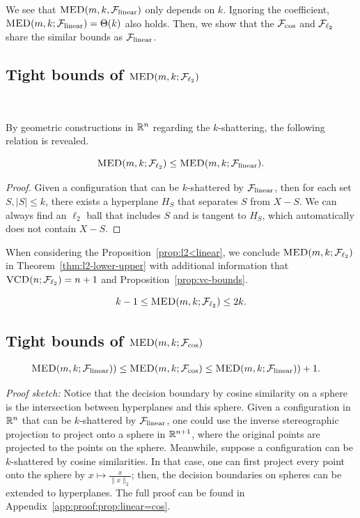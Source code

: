 We see that $\textsc{MED}(m, k, \mathcal{F}_{\rm linear})$ only depends on $k$. Ignoring the coefficient, $\textsc{MED}(m, k; \mathcal{F}_{\rm linear}) = \Theta(k)$ also holds. Then, we show that the $\mathcal{F}_{\cos}$ and $\mathcal{F}_{\ell_{2}}$ share the similar bounds as $\mathcal{F}_{\rm linear}$.

\subsection{Tight bounds of $\textsc{MED}(m, k;\mathcal{F}_{\ell_{2}})$}~\label{sec:generalize_linear}

By geometric constructions in $\mathbb{R}^n$ regarding the $k$-shattering, the following relation is revealed.

\begin{proposition}\label{prop:l2<linear}

$$\textsc{MED}(m, k; \mathcal{F}_{\ell_{2}}) \leq \textsc{MED}(m, k; \mathcal{F}_{\rm linear}). $$

\end{proposition}
\begin{proof}
Given a configuration that can be $k$-shattered by $\mathcal{F}_{\rm linear}$, then for each set $S, |S| \leq k$, there exists a hyperplane $H_S$ that separates $S$ from $X-S$. We can always find an $\ell_2$ ball that includes $S$ and is tangent to $H_S$, which automatically does not contain $X-S$.
\end{proof}
When considering the Proposition~\ref{prop:l2<linear}, we conclude $\textsc{MED}(m, k;\mathcal{F}_{\ell_{2}})$ in Theorem~\ref{thm:l2-lower-upper} with additional information that $\textsc{VCD}(n;\mathcal{F}_{\ell_{2}}) = n+1$ and Proposition~\ref{prop:vc-bounds}.

\begin{theorem}\label{thm:l2-lower-upper}
    $$k-1\leq \textsc{MED}(m, k; \mathcal{F}_{\ell_{2}}) \leq 2k.$$
\end{theorem}

\subsection{Tight bounds of $\textsc{MED}(m, k; \mathcal{F}_{\cos})$}

\begin{proposition}\label{prop:linear=cos}
\begin{align*}
    \textsc{MED}(m, k; \mathcal{F}_{\rm linear})) &\leq \textsc{MED}(m, k; \mathcal{F}_{\cos}) \leq \textsc{MED}(m, k; \mathcal{F}_{\rm linear})) + 1.
\end{align*}
\end{proposition}
\noindent\textit{Proof sketch:} Notice that the decision boundary by cosine similarity on a sphere is the intersection between hyperplanes and this sphere. Given a configuration in $\mathbb{R}^n$ that can be $k$-shattered by $\mathcal{F}_{\rm linear}$, one could use the inverse stereographic projection to project onto a sphere in $\mathbb{R}^{n+1}$, where the original points are projected to the points on the sphere. Meanwhile, suppose a configuration can be $k$-shattered by cosine similarities. In that case, one can first project every point onto the sphere by $x\mapsto \frac{x}{\|x\|_2}$; then, the decision boundaries on spheres can be extended to hyperplanes. The full proof can be found in Appendix~\ref{app:proof:prop:linear=cos}.

